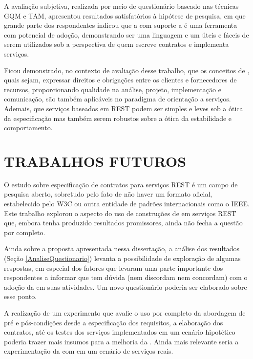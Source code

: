 A avaliação subjetiva, realizada por meio de questionário baseado nas técnicas GQM e TAM, apresentou
resultados satisfatórios à hipótese de pesquisa, em que grande parte dos respondentes indicou que a \neoidl{} com suporte
a \designbycontract{} é uma ferramenta com potencial de adoção, demonstrando ser uma linguagem e um 
\framework{} úteis e fáceis de serem utilizados sob a perspectiva de quem escreve contratos e implementa
serviços. 

Ficou demonstrado, no contexto de avaliação desse trabalho, que os conceitos de \designbycontract, quais sejam,
expressar direitos e obrigações entre os clientes e fornecedores de recursos, proporcionando qualidade na
análise, projeto, implementação e comunicação, são também aplicáveis no paradigma de orientação
a serviços. Ademais, que serviços baseados em \wss REST podem ser simples e leves sob a ótica
da especificação mas também serem robustos sobre a ótica da estabilidade e comportamento.


\section{TRABALHOS FUTUROS}
\vspace{-6mm}

O estudo sobre especificação de contratos para serviços REST é um campo de
pesquisa aberto, sobretudo pelo fato de não haver um formato oficial,
estabelecido pelo W3C ou outra entidade de padrões internacionais como o IEEE.
Este trabalho explorou o aspecto do uso de construções de \designbycontract{}
em serviços REST que, embora tenha produzido resultados promissores, ainda não
fecha a questão por completo.

Ainda sobre a proposta apresentada nessa dissertação, a análise dos resultados
(Seção \ref{AnaliseQuestionario}) levanta a possibilidade de exploração de
algumas respostas, em especial dos fatores que levaram uma parte importante dos
respondentes a informar que tem dúvida (nem discordam nem concordam) com o
adoção da \neoidl{} em suas atividades. Um novo questionário poderia ser
elaborado sobre esse ponto.

A realização de um experimento que avalie o uso por completo da abordagem de
pré e pós-condições desde a especificação dos requisitos, a elaboração dos
contratos, até os testes dos serviços implementados em um cenário hipotético
poderia trazer mais insumos para a melhoria da \neoidl{}. Ainda mais relevante
seria a experimentação da \neoidl{} com \designbycontract{} em um cenário de serviços reais.

